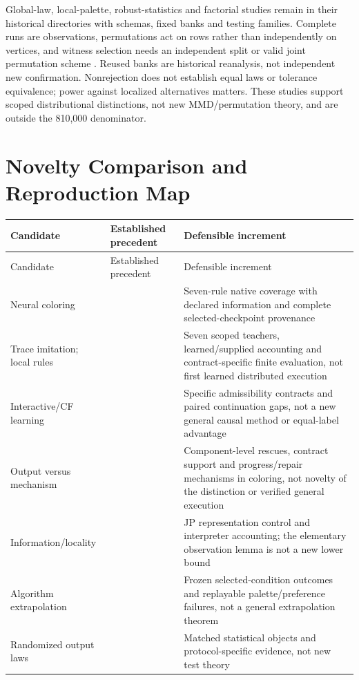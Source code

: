 \documentclass[10pt]{article}
\begin{document}
Global-law, local-palette, robust-statistics and factorial studies remain
in their historical directories with schemas, fixed banks and testing
families. Complete runs are observations, permutations act on rows rather
than independently on vertices, and witness selection needs an independent
split or valid joint permutation scheme
\citep{gretton2012kernel,hemerik2018exact,phipson2010permutation,holm1979simple}.
Reused banks are historical reanalysis, not independent new confirmation.
Nonrejection does not establish equal laws or tolerance equivalence; power
against localized alternatives matters. These studies support scoped
distributional distinctions, not new MMD/permutation theory, and are outside
the 810,000 denominator.

\section{Novelty Comparison and Reproduction Map}\label{app:related}
\begin{longtable}{p{.21\linewidth}p{.34\linewidth}p{.36\linewidth}}
\toprule Candidate & Established precedent & Defensible increment \\
\midrule\endfirsthead
\toprule Candidate & Established precedent & Defensible increment \\
\midrule\endhead
Neural coloring & \citet{lemos2019coloring,langedal2025ordering,
vanderbush2026warm,le2026contrastive} & Seven-rule native coverage with
declared information and complete selected-checkpoint provenance \\
Trace imitation; local rules & \citet{velickovic2020execution,velickovic2022clrs,minder2023salsa,qharabagh2026exact}
& Seven scoped teachers, learned/supplied accounting and contract-specific
finite evaluation, not first learned distributed execution \\
Interactive/CF learning & \citet{ross2011dagger,dehaan2019causal,geiger2022inducing,wu2022causal,bevilacqua2023causal} & Specific
admissibility contracts and paired continuation gaps, not a new general
causal method or equal-label advantage \\
Output versus mechanism & \citet{saldyt2025mind,najafgholizadeh2026premature,rodionov2025discrete}
& Component-level rescues, contract support and progress/repair mechanisms
in coloring, not novelty of the distinction or verified general execution \\
Information/locality & \citet{linial1992locality,loukas2020depth,
sato2019approximation} & JP representation control and interpreter accounting;
the elementary observation lemma is not a new lower bound \\
Algorithm extrapolation & \citet{xu2021extrapolate,mathys2023flood,
wittig2026which} & Frozen selected-condition outcomes and replayable
palette/preference failures, not a general extrapolation theorem \\
Randomized output laws & \citet{gretton2012kernel,hemerik2018exact,holm1979simple}
& Matched statistical objects and protocol-specific evidence, not new test theory \\
\bottomrule
\end{longtable}
\end{document}
